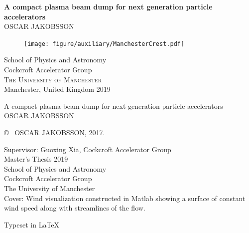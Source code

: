 \newpage
{}	%
\thispagestyle{empty}
\begin{center}
	\textbf{\Huge A compact plasma beam dump for next generation particle accelerators} \\[1cm]
	{\large OSCAR JAKOBSSON}
	
	\vfill	
	\begin{figure}[H]
	\centering
	\texttt{[image: figure/auxiliary/ManchesterCrest.pdf]} \\	
	\end{figure}	\vspace{5mm}	
	
	School of Physics and Astronomy \\
	Cockcroft Accelerator Group\\
	\textsc{The University of Manchester} \\
	Manchester, United Kingdom 2019 \\
\end{center}


\newpage
\thispagestyle{plain}
\vspace*{4.5cm}
A compact plasma beam dump for next generation particle accelerators\\
OSCAR JAKOBSSON \setlength{\parskip}{1cm}

\copyright ~ OSCAR JAKOBSSON, 2017. \setlength{\parskip}{1cm}

Supervisor: Guoxing Xia, Cockcroft Accelerator Group\\

Master's Thesis 2019\\	%
School of Physics and Astronomy\\
Cockcroft Accelerator Group\\
The University of Manchester\\

\vfill
Cover: Wind visualization constructed in Matlab showing a surface of constant wind speed along with streamlines of the flow. \setlength{\parskip}{0.5cm}

Typeset in \LaTeX \\

